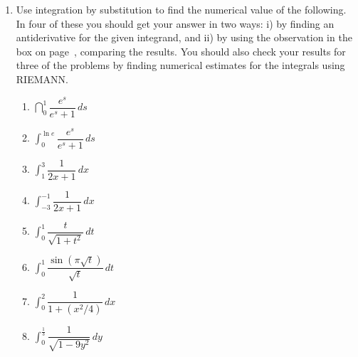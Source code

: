 \begin{enumerate}
\begin{enumerate}
  \item ${\dint \sqrt{3-x}\,dx}$


  \item ${\dint \dfrac{dr}{r\ln{r}}}$


  \item ${\dint e^x\sin(1+e^x)\,dx}$


  \item ${\dint \dfrac{y}{1+y^2}\,dy}$


  \item ${\dint \dfrac{w}{\sqrt{1-w^2}}\, dw}$


  \item ${\dint \dfrac{1}{1+4y^2}\,dy}$


  \item ${\dint \dfrac{1}{\sqrt{1-9w^2}}\, dw}$
\mbox{}


\end{enumerate}
\item Use integration by substitution to find the numerical value of
the following.  In four of these you should get your answer in two
ways: i) by finding an antiderivative for the given integrand, and ii)
by using the observation in the box on page~\pageref{defint},
comparing the results.  You should also check your results for three
of the problems by finding numerical estimates for the integrals using
RIEMANN.



  \begin{enumerate}
  \item ${\dint_0^1 \dfrac{e^s}{e^s+1}\,ds}$


  \item ${\displaystyle \int_0^{\ln{e}}
\dfrac{e^s}{e^s+1}\,ds}$


  \item ${\displaystyle \int_1^3 \dfrac{1}{2x+1}\,dx}$


  \item ${\displaystyle \int_{-3}^{-1} \dfrac{1}{2x+1}\,dx}$

  \item ${\displaystyle \int_0^1
	\dfrac{t}{\sqrt{1 + t^2}}\,dt}$


  \item ${\displaystyle \int_0^1
	\dfrac{\sin(\pi\sqrt{t})}{\sqrt{t}}\,dt}$


  \item ${\displaystyle \int_0^2
	\dfrac{1}{1+ (x^2/4)}\,dx}$


  \item ${\displaystyle \int_0^{\tfrac{1}{3}}
	\dfrac{1}{\sqrt{1-9y^2}}\,dy}$
\mbox{}



\end{enumerate}
\end{enumerate}
